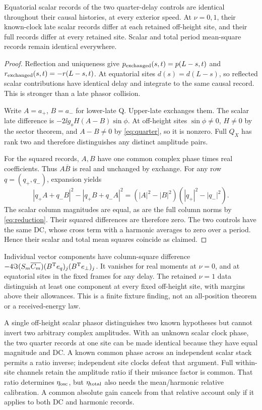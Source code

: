 \begin{proposition}\label{prop:swap}
Equatorial scalar records of the two quarter-delay controls are identical throughout their causal histories, at every exterior speed. At $\nu=0,1$, their known-clock late scalar records differ at each retained off-height site, and their full records differ at every retained site. Scalar and total period mean-square records remain identical everywhere.
\end{proposition}
\begin{proof}
Reflection and uniqueness give $p_{\rm exchanged}(s,t)=p(L-s,t)$ and $r_{\rm exchanged}(s,t)=-r(L-s,t)$. At equatorial sites $d(s)=d(L-s)$, so reflected scalar contributions have identical delay and integrate to the same causal record. This is stronger than a late phasor collision.

Write $A=a_+$, $B=a_-$ for lower-late Q. Upper-late exchanges them. The scalar late difference is
$-2\ii g_oH(A-B)\sin\phi$. At off-height sites $\sin\phi\ne0$, $H\ne0$ by the sector theorem, and $A-B\ne0$ by \eqref{eq:quarter}, so it is nonzero. Full $Q_X$ has rank two and therefore distinguishes any distinct amplitude pairs.

For the squared records, $A,B$ have one common complex phase times real coefficients. Thus $A\overline B$ is real and unchanged by exchange. For any row $q=(q_+,q_-)$, expansion yields
\begin{equation}\label{eq:swap_power}
 |q_+A+q_-B|^2-|q_+B+q_-A|^2
 =(|A|^2-|B|^2)(|q_+|^2-|q_-|^2).
\end{equation}
The scalar column magnitudes are equal, as are the full column norms by \eqref{eq:reduction}. Their squared differences are therefore zero. The two controls have the same DC, whose cross term with a harmonic averages to zero over a period. Hence their scalar and total mean squares coincide as claimed.
\end{proof}

Individual vector components have column-square difference
$-4\Im(S_m\overline{C_m})(B^{\mathrm T} e_q)_j(B^{\mathrm T} e_\perp)_j$. It vanishes for real moments at $\nu=0$, and at equatorial sites in the fixed frames for any delay. The retained $\nu=1$ data distinguish at least one component at every fixed off-height site, with margins above their allowances. This is a finite fixture finding, not an all-position theorem or a received-energy law.

A single off-height scalar phasor distinguishes two known hypotheses but cannot invert two arbitrary complex amplitudes. With an unknown scalar clock phase, the two quarter records at one site can be made identical because they have equal magnitude and DC. A known common phase across an independent scalar stack permits a ratio inverse; independent site clocks defeat that argument. Full within-site channels retain the amplitude ratio if their nuisance factor is common. That ratio determines $\eta_{\rm osc}$, but $\eta_{\rm total}$ also needs the mean/harmonic relative calibration. A common absolute gain cancels from that relative account only if it applies to both DC and harmonic records.

